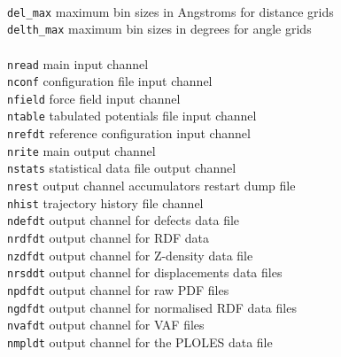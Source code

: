 \begin{tabbing}
\>                   \>                      \> \\
\> {\tt del\_max}                     \>  maximum bin sizes in Angstroms for distance grids \\
\> {\tt delth\_max}                   \>  maximum bin sizes in degrees for angle grids \\
\>                   \>                      \> \\
\> {\tt nread}                           \> main input channel \\
\> {\tt nconf}                          \> configuration file input channel \\
\> {\tt nfield}                         \> force field input channel \\
\> {\tt ntable}                         \> tabulated potentials file input channel \\
\> {\tt nrefdt}                         \> reference configuration input channel \\
\> {\tt nrite}                           \> main output channel \\
\> {\tt nstats}                         \> statistical data file output channel \\
\> {\tt nrest}                          \> output channel accumulators restart dump file \\
\> {\tt nhist}                          \> trajectory history file channel \\
\> {\tt ndefdt}                         \> output channel for defects data file \\
\> {\tt nrdfdt}                         \> output channel for RDF data \\
\> {\tt nzdfdt}                         \> output channel for Z-density data file \\
\> {\tt nrsddt}                         \> output channel for displacements data files \\
\> {\tt npdfdt}                         \> output channel for raw PDF files \\
\> {\tt ngdfdt}                         \> output channel for normalised RDF data files \\
\> {\tt nvafdt}                         \> output channel for VAF files \\
\> {\tt nmpldt}                         \> output channel for the PLOLES data file \\
\>                   \>                      \> \\

\end{tabbing}
